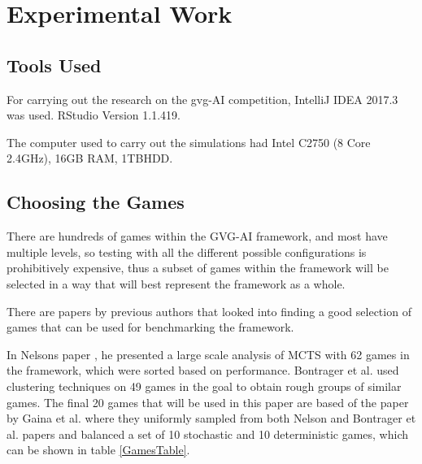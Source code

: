 \documentclass[journal]{IEEEtran}
\begin{document}

\section{Experimental Work}

	\subsection{Tools Used}
	For carrying out the research on the gvg-AI competition, IntelliJ IDEA 2017.3 was used. RStudio Version 1.1.419.
	
	The computer used to carry out the simulations had Intel C2750 (8 Core \@ 2.4GHz), 16GB RAM, 1TBHDD.

	\subsection{Choosing the Games}
	
	There are hundreds of games within the GVG-AI framework, and most have multiple levels, so testing with all the different possible configurations is prohibitively expensive, thus a subset of games within the framework will be selected in a way that will best represent the framework as a whole.
	
	There are papers by previous authors that looked into finding a good selection of games that can be used for benchmarking the framework. \cite{gaina2017population}
	
	In Nelsons paper \cite{nelson2016investigating}, he presented a large scale analysis of MCTS with 62 games in the framework, which were sorted based on performance. Bontrager et al. \cite{bontrager2016matching} used clustering techniques on 49 games in the goal to obtain rough groups of similar games.
	The final 20 games that will be used in this paper are based of the paper by Gaina et al. \cite{gaina2017population} where they uniformly sampled from both Nelson and Bontrager et al. papers and balanced a set of 10 stochastic and 10 deterministic games, which can be shown in table \ref{GamesTable}.
	
\end{document}
